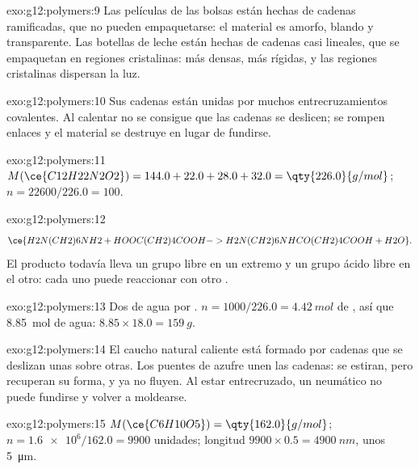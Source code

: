 \begin{solution}{exo:g12:polymers:9}
Las películas de las bolsas están hechas de cadenas ramificadas, que no
pueden empaquetarse: el material es amorfo, blando y transparente. Las
botellas de leche están hechas de cadenas casi lineales, que se
empaquetan en regiones cristalinas: más densas, más rígidas, y las
regiones cristalinas dispersan la luz.
\end{solution}

\begin{solution}{exo:g12:polymers:10}
Sus cadenas están unidas por muchos entrecruzamientos covalentes. Al
calentar no se consigue que las cadenas se deslicen; se rompen enlaces y
el material se destruye en lugar de fundirse.
\end{solution}

\begin{solution}{exo:g12:polymers:11}
$M(\ce{C12H22N2O2}) = 144.0 + 22.0 + 28.0 + 32.0 = \qty{226.0}{g/mol}$;
$n = 22600/226.0 = 100$.
\end{solution}

\begin{solution}{exo:g12:polymers:12}
\[
  \ce{H2N(CH2)6NH2 + HOOC(CH2)4COOH -> H2N(CH2)6NHCO(CH2)4COOH + H2O} .
\]
El producto todavía lleva un grupo  libre en un extremo y un grupo
ácido libre en el otro: cada uno puede reaccionar con otro .
\end{solution}

\begin{solution}{exo:g12:polymers:13}
Dos  de agua por . $n = 1000/226.0 =
\qty{4.42}{mol}$ de , así que \qty{8.85}{mol} de
agua:
$8.85 \times 18.0 = \qty{159}{g}$.
\end{solution}

\begin{solution}{exo:g12:polymers:14}
El caucho natural caliente está formado por cadenas que se deslizan unas
sobre otras. Los puentes de azufre unen las cadenas: se estiran, pero
recuperan su forma, y ya no fluyen. Al estar entrecruzado, un neumático
no puede fundirse y volver a moldearse.
\end{solution}

\begin{solution}{exo:g12:polymers:15}
$M(\ce{C6H10O5}) = \qty{162.0}{g/mol}$; $n = \num{1.6e6}/162.0 = 9900$
unidades; longitud $9900 \times 0.5 = \qty{4900}{nm}$, unos
\qty{5}{\micro m}.
\end{solution}

